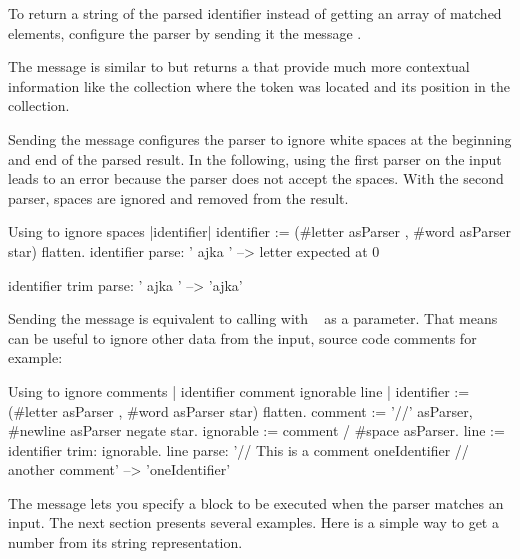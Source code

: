\documentclass[a4paper,10pt,twoside]{book}
\begin{document}
To return a string of the parsed identifier instead of getting an
array of matched elements, configure the parser by sending it the
message .



The message  is similar to  but returns a
 that provide much more contextual information like the
collection where the token was located and its position in the
collection.

Sending the message  configures the parser to ignore
white spaces at the beginning and end of the parsed result. In the
following, using the first parser on the input leads to an error
because the parser does not accept the spaces. With the
second parser, spaces are ignored and removed from the result.

\begin{script}{Using  to ignore spaces}
|identifier|
identifier := (#letter asParser , #word asParser star) flatten.
identifier parse: '  ajka   '          -->  letter expected at 0

identifier trim parse: '  ajka   '          --> 'ajka'
\end{script}

Sending the message  is equivalent to calling  with
~ as a parameter. That means  can be
useful to ignore other data from the input, source code comments for
example:

\begin{script}{Using  to ignore comments}
| identifier comment ignorable line |
identifier := (#letter asParser , #word asParser star) flatten.
comment := '//' asParser, #newline asParser negate star.
ignorable := comment / #space asParser.
line := identifier trim: ignorable.
line parse: '// This is a comment
oneIdentifier // another comment'          --> 'oneIdentifier'
\end{script}

The message \ppmthind{==>} lets you specify a block to be executed
when the parser matches an input. The next section presents several
examples. Here is a simple way to get a number from its string
representation.
\end{document}

